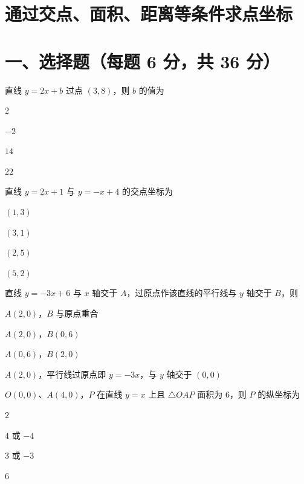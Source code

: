 \documentclass{exam-zh}
\begin{document}
\section*{通过交点、面积、距离等条件求点坐标}

\section*{一、选择题（每题 6 分，共 36 分）}



\begin{question}[points=6]
  直线 $y=2x+b$ 过点 $(3,8)$，则 $b$ 的值为
  \begin{choices}
    \item $2$
    \item $-2$
    \item $14$
    \item $22$
  \end{choices}
\end{question}



\begin{question}[points=6]
  直线 $y=2x+1$ 与 $y=-x+4$ 的交点坐标为
  \begin{choices}
    \item $(1, 3)$
    \item $(3, 1)$
    \item $(2, 5)$
    \item $(5, 2)$
  \end{choices}
\end{question}



\begin{question}[points=6]
  直线 $y=-3x+6$ 与 $x$ 轴交于 $A$，过原点作该直线的平行线与 $y$ 轴交于 $B$，则
  \begin{choices}
    \item $A(2,0)$，$B$ 与原点重合
    \item $A(2,0)$，$B(0,6)$
    \item $A(0,6)$，$B(2,0)$
    \item $A(2,0)$，平行线过原点即 $y=-3x$，与 $y$ 轴交于 $(0,0)$
  \end{choices}
\end{question}



\begin{question}[points=6]
  $O(0,0)$、$A(4,0)$，$P$ 在直线 $y=x$ 上且 $\triangle OAP$ 面积为 $6$，则 $P$ 的纵坐标为
  \begin{choices}
    \item $2$
    \item $4$ 或 $-4$
    \item $3$ 或 $-3$
    \item $6$
  \end{choices}
\end{question}
\end{document}
